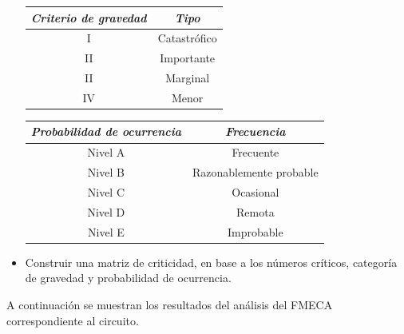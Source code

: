 \documentclass{article}
\begin{document}
\begin{itemize}
\begin{table}[h]
\centering
\begin{tabular}{@{}|c|c|@{}}
\toprule
\textit{\textbf{Criterio de gravedad}} & \textit{\textbf{Tipo}} \\ \midrule
I & Catastrófico \\ \midrule
II & Importante \\ \midrule
II & Marginal \\ \midrule
IV & Menor \\ \bottomrule
\end{tabular}
\end{table}

\begin{table}[H]
\centering
\begin{tabular}{@{}|c|c|@{}}
\toprule
\textit{\textbf{Probabilidad de ocurrencia}} & \textit{\textbf{Frecuencia}} \\ \midrule
Nivel A & Frecuente \\ \midrule
Nivel B & Razonablemente probable \\ \midrule
Nivel C & Ocasional \\ \midrule
Nivel D & Remota \\ \midrule
Nivel E & Improbable \\ \bottomrule
\end{tabular}
\end{table}

\item Construir una matriz de criticidad, en base a los números críticos, categoría de gravedad y probabilidad de ocurrencia.
\end{itemize}

A continuación se muestran los resultados del análisis del FMECA correspondiente al circuito.
\end{document}
